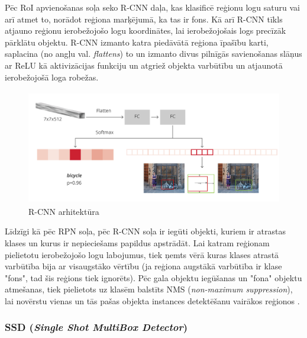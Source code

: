 Pēc RoI apvienošanas soļa seko R-CNN daļa, kas klasificē reģionu logu saturu vai arī atmet to, norādot reģiona marķējumā, ka tas ir fons. Kā arī R-CNN tīkls atjauno reģionu ierobežojošo logu koordinātes, lai ierobežojošais logs precīzāk pārklātu objektu. R-CNN izmanto katra piedāvātā reģiona īpašību karti, saplacina (no angļu val. \textit{flattens}) to un izmanto divus pilnīgās savienošanas slāņus ar ReLU kā aktivizācijas funkciju un atgriež objekta varbūtību un atjaunotā ierobežojošā loga robežas.

\begin{figure}[h]%
	\centering
	\includegraphics[height=5cm]{images/rcnnarch.png} %
	\caption{R-CNN arhitektūra \cite{fasterrcnn}}%
	\label{fig:example}%
\end{figure}

Līdzīgi kā pēc RPN soļa, pēc R-CNN soļa ir iegūti objekti, kuriem ir atrastas klases un kurus ir nepieciešams papildus apstrādāt. Lai  katram reģionam pielietotu ierobežojošo logu labojumus, tiek ņemts vērā kuras klases atrastā varbūtība bija ar visaugstāko vērtību (ja reģiona augstākā varbūtība ir klase "fons", tad šis reģions tiek ignorēts). Pēc gala objektu iegūšanas un "fona" objektu atmešanas, tiek pielietots uz klasēm balstīts NMS (\textit{non-maximum suppression}), lai novērstu vienas un tās pašas objekta instances detektēšanu vairākos reģionos \cite{hosang2017learning}.

\subsubsection{SSD (\textit{Single Shot MultiBox Detector})}

